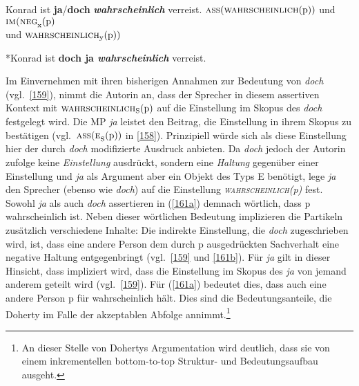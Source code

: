 \begin{exe}
	\ex\label{161} 
		\begin{xlist}	
			\ex\label{161a} Konrad ist \textbf{ja}/\textbf{doch} \textbf{\textit{wahrscheinlich}} verreist.
			\ex\label{161b} $\textrm{\textsc{ass}(\textsc{wahrscheinlich}(p)})$ und $\textrm{\textsc{im(neg}}_{\textrm{x}}(\textrm{p})$ \\ und $\textrm{\textsc{wahrscheinlich}}_{\textrm{y}}(\textrm{p}))$
			\hfill\hbox{\citet[85]{Doherty1985}}
		\end{xlist}
\end{exe}

\begin{exe}
	\ex\label{162} 
		*Konrad ist \textbf{doch ja \textit{wahrscheinlich}} verreist.
\end{exe}      
Im Einvernehmen mit ihren bisherigen Annahmen zur Bedeutung von \textit{doch} (vgl.\ \ref{159}), nimmt die Autorin an, dass der Sprecher in diesem assertiven Kontext mit $\textrm{\textsc{wahrscheinlich}}_{\textrm{S}}(\textrm{p})$ auf die Einstellung im Skopus des \textit{doch} festgelegt wird. Die MP \textit{ja} leistet den Beitrag, die Einstellung in ihrem Skopus zu bestätigen (vgl.\ $\textrm{\textsc{ass}(\textsc{e}}_{\textrm{S}}(\textrm{p}))$ in \ref{158}). Prinzipiell würde sich als diese Einstellung hier der durch \textit{doch} modifizierte Ausdruck anbieten. Da \textit{doch} jedoch der Autorin zufolge keine \emph{Einstellung} ausdrückt, sondern eine \emph{Haltung} gegenüber einer Einstellung und \textit{ja} als Argument aber ein Objekt des Typs E benötigt, lege \textit{ja} den Sprecher (ebenso wie \textit{doch}) auf die Einstellung \textit{\textsc{wahrscheinlich}(p)} fest. Sowohl \textit{ja} als auch \textit{doch} assertieren in (\ref{161a}) demnach wörtlich, dass p wahrscheinlich ist. Neben dieser wörtlichen Bedeutung implizieren die Partikeln zusätzlich verschie\-dene Inhalte: Die indirekte Einstellung, die \textit{doch} zugeschrieben wird, ist, dass eine andere Person dem durch p ausgedrückten Sachverhalt eine negative Haltung entgegenbringt (vgl.\ \ref{159} und \ref{161b}). Für \textit{ja} gilt in dieser Hinsicht, dass impliziert wird, dass die Einstellung im Skopus des \textit{ja} von jemand anderem geteilt wird (vgl.\ \ref{159}). Für (\ref{161a}) bedeutet dies, dass auch eine andere Person p für wahrscheinlich hält. Dies sind die Bedeutungsanteile, die Doherty im Falle der akzeptablen Abfolge annimmt.\footnote{An dieser Stelle von Dohertys Argumentation wird deutlich, dass sie von einem inkrementellen bottom-to-top Struktur- und Bedeutungsaufbau ausgeht.}


